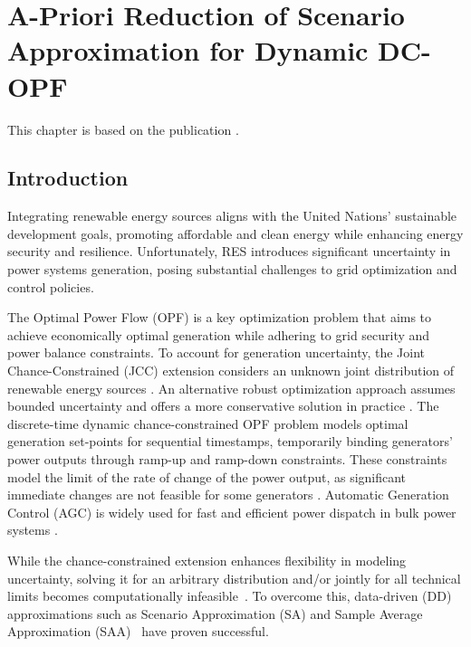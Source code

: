\chapter{A-Priori Reduction of Scenario Approximation for Dynamic DC-OPF}
This chapter is based on the publication . 
\label{chap:dc_stochastic_approx}

\section{Introduction}
\label{sec:introduction}
\vspace{-1mm}
Integrating renewable energy sources aligns with the United Nations' sustainable development goals, promoting affordable and clean energy while enhancing energy security and resilience. Unfortunately, RES introduces significant uncertainty in power systems generation, posing substantial challenges to grid optimization and control policies.

The Optimal Power Flow (OPF) \cite{stott2012optimal} is a key optimization problem that aims to achieve economically optimal generation while adhering to grid security and power balance constraints. To account for generation uncertainty, the Joint Chance-Constrained (JCC) extension considers an unknown joint distribution of renewable energy sources \cite{geng2019data, bienstock2014chance}. An alternative robust optimization approach assumes bounded uncertainty and offers a more conservative solution in practice \cite{ben2002robust, ding2016adjustable}.
%
The discrete-time dynamic chance-constrained OPF problem \cite{lou2019multi, capitanescu2007improving, monticelli1987security} models optimal generation set-points for sequential timestamps, temporarily binding generators' power outputs through ramp-up and ramp-down constraints. These constraints model the limit of the rate of change of the power output, as significant immediate changes are not feasible for some generators \cite{frangioni2008solving}. Automatic Generation Control (AGC) is widely used for fast and efficient power dispatch in bulk power systems \cite{xu2017real}.



While the chance-constrained extension enhances flexibility in modeling uncertainty, solving it for an arbitrary distribution and/or jointly for all technical limits becomes computationally infeasible~\cite{nemirovski2012safe, jia2021iterative}. To overcome this, data-driven (DD) approximations such as Scenario Approximation (SA) \cite{calafiore2006scenario} and Sample Average Approximation (SAA)~\cite{ahmed2008solving} have proven successful.

